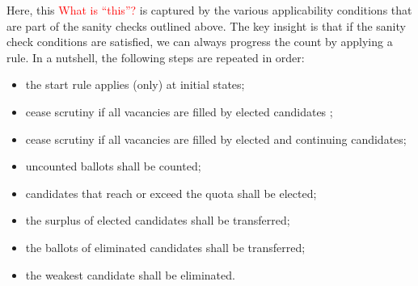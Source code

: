 \documentclass{llncs}
\newcommand{\textred}[1]{\textrm{\textcolor{red}{#1}}}
\begin{document}
Here, this \textred{What is ``this''?} is captured by the various applicability conditions that
are part of the sanity checks outlined above. The key insight is
that if the sanity check conditions are satisfied, we can always
progress the count by applying a rule. In a nutshell, the following
steps are repeated in order:
\begin{itemize}
  \item the start rule applies (only) at initial states;
  \item cease scrutiny if all vacancies are filled by elected candidates ;
  \item cease scrutiny if all vacancies are filled by elected and continuing candidates;
  \item uncounted ballots shall be counted;
  \item candidates that reach or exceed the quota shall be elected;
  \item the surplus of elected candidates shall be transferred;
  \item the ballots of eliminated candidates shall be transferred;
  \item the weakest candidate shall be eliminated.
\end{itemize}
\end{document}
